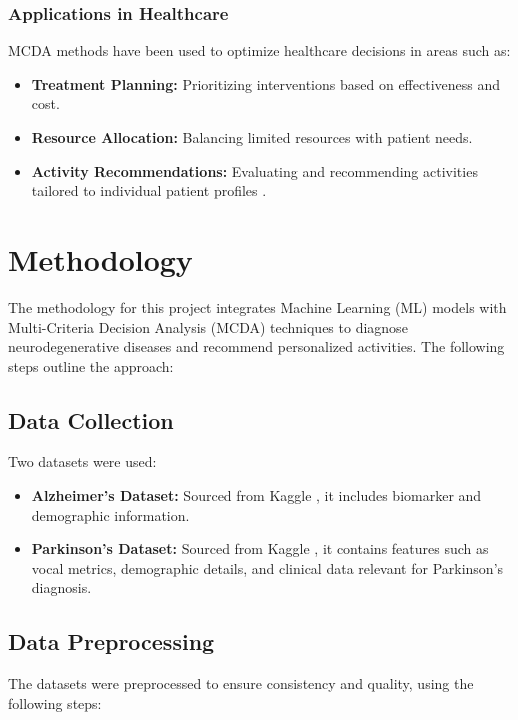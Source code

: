 \documentclass[conference]{IEEEtran}
\begin{document}
\subsubsection{Applications in Healthcare}
MCDA methods have been used to optimize healthcare decisions in areas such as:
\begin{itemize}
    \item \textbf{Treatment Planning:} Prioritizing interventions based on effectiveness and cost.
    \item \textbf{Resource Allocation:} Balancing limited resources with patient needs.
    \item \textbf{Activity Recommendations:} Evaluating and recommending activities tailored to individual patient profiles \cite{b8}.
\end{itemize}

\section{Methodology}
The methodology for this project integrates Machine Learning (ML) models with Multi-Criteria Decision Analysis (MCDA) techniques to diagnose neurodegenerative diseases and recommend personalized activities. The following steps outline the approach:

\subsection{Data Collection}
Two datasets were used:
\begin{itemize}
    \item \textbf{Alzheimer’s Dataset:} Sourced from Kaggle \cite{b4}, it includes biomarker and demographic information.
    \item \textbf{Parkinson’s Dataset:} Sourced from Kaggle \cite{b6}, it contains features such as vocal metrics, demographic details, and clinical data relevant for Parkinson’s diagnosis.
\end{itemize}

\subsection{Data Preprocessing}
The datasets were preprocessed to ensure consistency and quality, using the following steps:
\end{document}
